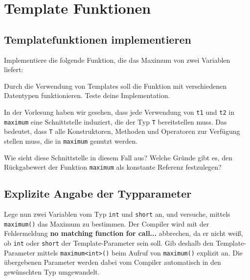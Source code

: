 \section{\ExercisePrefixAdvanced Template Funktionen}
\subsection{Templatefunktionen implementieren}
Implementiere die folgende Funktion, die das Maximum von zwei Variablen liefert:



Durch die Verwendung von Templates soll die Funktion mit verschiedenen Datentypen funktionieren.
Teste deine Implementation.

In der Vorlesung haben wir gesehen, dass jede Verwendung von \lstinline{t1} und \lstinline{t2} in \lstinline{maximum} eine Schnittstelle induziert, die der Typ \lstinline{T} bereitstellen muss.
Das bedeutet, dass \lstinline{T} alle Konstruktoren, Methoden und Operatoren zur Verfügung stellen muss, die in \lstinline{maximum} genutzt werden.

Wie sieht diese Schnittstelle in diesem Fall aus?
Welche Gründe gibt es, den Rückgabewert der Funktion \lstinline{maximum} als konstante Referenz festzulegen?


\subsection{Explizite Angabe der Typparameter}
Lege nun zwei Variablen vom Typ \lstinline{int} und \lstinline{short} an, und versuche, mittels \lstinline{maximum()} das Maximum zu bestimmen.
Der Compiler wird mit der Fehlermeldung \textbf{no matching function for call...} abbrechen, da er nicht weiß, ob \lstinline{int} oder \lstinline{short} der Template-Parameter sein soll.
Gib deshalb den Template-Parameter mittels \lstinline{maximum<int>()} beim Aufruf von \lstinline{maximum()} explizit an.
Die übergebenen Parameter werden dabei vom Compiler automatisch in den gewünschten Typ umgewandelt.

